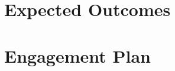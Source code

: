 \documentclass[12pt]{elsarticle}
\begin{document}
\section{Expected Outcomes} %

\section{Engagement Plan} %
\end{document}
